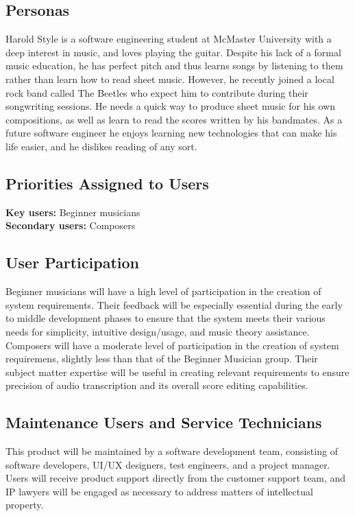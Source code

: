 \documentclass[12pt]{article}
\begin{document}
\subsection{Personas}
Harold Style is a software engineering student at McMaster University with a deep interest in music, and loves playing the guitar. Despite his lack of a formal music education, 
he has perfect pitch and thus learns songs by listening to them rather than learn how to read sheet music. However, he recently joined a local rock band called The Beetles who 
expect him to contribute during their songwriting sessions. He needs a quick way to produce sheet music for his own compositions, as well as learn to read the scores written by 
his bandmates. As a future software engineer he enjoys learning new technologies that can make his life easier, and he dislikes reading of any sort.

\subsection{Priorities Assigned to Users}
\textbf{Key users:} Beginner musicians \\
\textbf{Secondary users:} Composers

\subsection{User Participation}
Beginner musicians will have a high level of participation in the creation of system requirements. Their feedback will be especially essential during the early to middle development phases to ensure that the system meets their various needs for simplicity, intuitive design/usage, and music theory assistance.
Composers will have a moderate level of participation in the creation of system requiremens, slightly less than that of the Beginner Musician group. Their subject matter expertise will be useful in creating relevant requirements to ensure precision of audio transcription and its overall score editing capabilities.
\subsection{Maintenance Users and Service Technicians}
This product will be maintained by a software development team, consisting of software developers, UI/UX designers, test engineers, and a project manager. 
Users will receive product support directly from the customer support team, and IP lawyers will be engaged as necessary to address matters of intellectual property.
\end{document}
